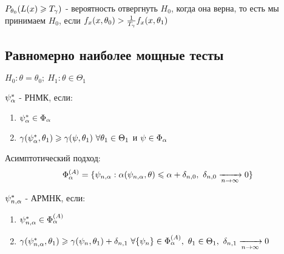 $P_{\theta_0}(L(x) \geqslant T_{\gamma})$ - вероятность отвергнуть $H_0$, когда она верна, то есть мы принимаем $H_0$, если $f_x(x, \theta_0) > \frac{1}{T_{\gamma}}f_x(x, \theta_1)$

\subsection{Равномерно наиболее мощные тесты}

$H_0 : \theta = \theta_0;~H_1 : \theta \in \Theta_1$
\begin{definition}
  $\psi_{\alpha}^{*}$ - РНМК, если:
  \begin{enumerate}
    \item $\psi_{\alpha}^{*} \in \Phi_{\alpha}$
    \item $\gamma(\psi_{\alpha}^{*}, \theta_1) \geqslant \gamma(\psi, \theta_1)~\forall \theta_1 \in \Theta_1$ и $\psi \in \Phi_{\alpha}$
  \end{enumerate}
\end{definition}

Асимптотический подход: \\
\[
  \Phi_{\alpha}^{(A)} = \{ \psi_{n, \alpha} : \alpha(\psi_{n, \alpha}, \theta) \leqslant \alpha + \delta_{n, 0},~\delta_{n, 0} \xrightarrow[n \to \infty]{} 0 \}
\]
\begin{definition}
  $\psi_{n, \alpha}^{*}$ - АРМНК, если:
  \begin{enumerate}
    \item $\psi_{n, \alpha}^{*} \in \Phi_{\alpha}^{(A)}$
    \item $\gamma(\psi_{n, \alpha}^{*}, \theta_1) \geqslant \gamma(\psi_n, \theta_1) + \delta_{n, 1}~\forall\{\psi_n\} \in \Phi_{\alpha}^{(A)},~\theta_1 \in \Theta_1,~
      \delta_{n, 1} \xrightarrow[n \to \infty]{} 0$
  \end{enumerate}
\end{definition}
